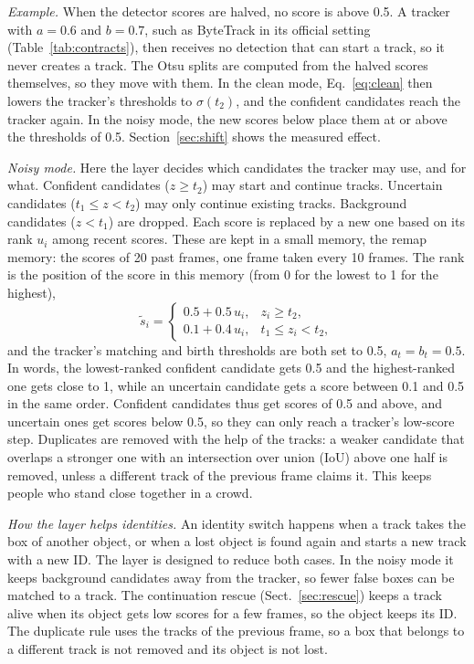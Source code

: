 \emph{Example.} When the detector scores are halved, no score is above 0.5.
A tracker with $a=0.6$ and $b=0.7$, such as ByteTrack in its official setting
(Table~\ref{tab:contracts}), then receives no detection that can start a
track, so it never creates a track. The Otsu splits are computed from the
halved scores themselves, so they move with them. In the clean mode,
Eq.~\eqref{eq:clean} then lowers the tracker's thresholds to $\sigma(t_2)$,
and the confident candidates reach the tracker again. In the noisy mode, the
new scores below place them at or above the thresholds of 0.5.
Section~\ref{sec:shift} shows the measured effect.

\emph{Noisy mode.} Here the layer decides which candidates the tracker may
use, and for what. Confident candidates ($z\ge t_2$) may start and continue
tracks. Uncertain candidates ($t_1\le z<t_2$) may only continue existing
tracks. Background candidates ($z<t_1$) are dropped. Each score is replaced
by a new one based on its rank $u_i$ among recent scores. These are kept in a
small memory, the remap memory: the scores of 20 past frames, one frame taken
every 10 frames. The rank is the position of the score in this memory (from 0 for the
lowest to 1 for the highest),
\begin{equation}
\tilde{s}_i=
\begin{cases}
0.5+0.5\,u_i, & z_i\ge t_2,\\
0.1+0.4\,u_i, & t_1\le z_i<t_2,
\end{cases}
\label{eq:remap}
\end{equation}
and the tracker's matching and birth thresholds are both set to 0.5,
$a_t=b_t=0.5$. In words, the lowest-ranked confident candidate gets 0.5 and
the highest-ranked one gets close to 1, while an uncertain candidate gets a
score between 0.1 and 0.5 in the same order. Confident candidates thus get
scores of 0.5 and above, and
uncertain ones get scores below 0.5, so they can only reach a tracker's
low-score step. Duplicates are removed with the help of the tracks: a weaker
candidate that overlaps a stronger one with an intersection over union (IoU)
above one half is removed, unless a different track of the previous frame
claims it. This keeps people who stand close together in a crowd.

\emph{How the layer helps identities.} An identity switch happens when a track
takes the box of another object, or when a lost object is found again and
starts a new track with a new ID. The layer is designed to reduce both cases.
In the noisy mode it keeps background candidates away from the tracker, so
fewer false boxes can be matched to a track. The continuation rescue
(Sect.~\ref{sec:rescue}) keeps a track alive when its object gets low scores
for a few frames, so the object keeps its ID. The duplicate rule uses the
tracks of the previous frame, so a box that belongs to a different track is
not removed and its object is not lost.

